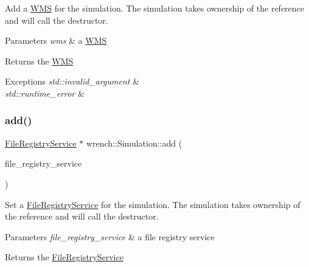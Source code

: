 Add a \hyperlink{classwrench_1_1_w_m_s}{W\+MS} for the simulation. The simulation takes ownership of the reference and will call the destructor. 


\begin{DoxyParams}{Parameters}
{\em wms} & a \hyperlink{classwrench_1_1_w_m_s}{W\+MS}\\
\hline
\end{DoxyParams}
\begin{DoxyReturn}{Returns}
the \hyperlink{classwrench_1_1_w_m_s}{W\+MS}
\end{DoxyReturn}

\begin{DoxyExceptions}{Exceptions}
{\em std\+::invalid\+\_\+argument} & \\
\hline
{\em std\+::runtime\+\_\+error} & \\
\hline
\end{DoxyExceptions}
\mbox{\label{classwrench_1_1_simulation_a18a43da399eb9d0b59c3af66c46ecd16}} 
\subsubsection{\texorpdfstring{add()}{add()}\hspace{0.1cm}{\footnotesize\ttfamily [5/5]}}
{\footnotesize\ttfamily \hyperlink{classwrench_1_1_file_registry_service}{File\+Registry\+Service} $\ast$ wrench\+::\+Simulation\+::add (\begin{DoxyParamCaption}\item[{\hyperlink{classwrench_1_1_file_registry_service}{File\+Registry\+Service} $\ast$}]{file\+\_\+registry\+\_\+service }\end{DoxyParamCaption})}



Set a \hyperlink{classwrench_1_1_file_registry_service}{File\+Registry\+Service} for the simulation. The simulation takes ownership of the reference and will call the destructor. 


\begin{DoxyParams}{Parameters}
{\em file\+\_\+registry\+\_\+service} & a file registry service\\
\hline
\end{DoxyParams}
\begin{DoxyReturn}{Returns}
the \hyperlink{classwrench_1_1_file_registry_service}{File\+Registry\+Service}
\end{DoxyReturn}

